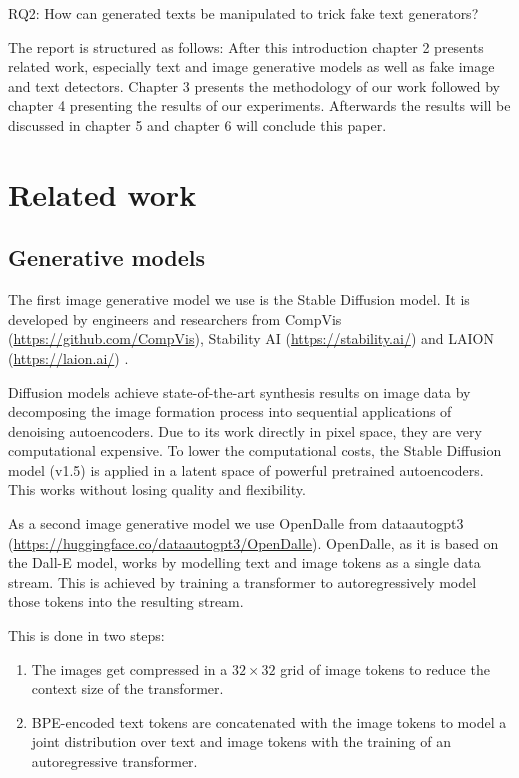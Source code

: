 \documentclass{article} %
\begin{document}
RQ2: How can generated texts be manipulated to trick fake text generators?


The report is structured as follows: After this introduction chapter 2 presents related work, especially text and image generative models as well as fake image and text detectors. Chapter 3 presents the methodology of our work followed by chapter 4 presenting the results of our experiments. Afterwards the results will be discussed in chapter 5 and chapter 6 will conclude this paper.

\section{Related work}

\subsection{Generative models}

The first image generative model we use is the Stable Diffusion model. It is developed by engineers and researchers from CompVis (\url{https://github.com/CompVis}), Stability AI (\url{https://stability.ai/}) and LAION (\url{https://laion.ai/}) \cite{patil2022stable}. 

Diffusion models achieve state-of-the-art synthesis results on image data by decomposing the image formation process into sequential applications of denoising autoencoders. Due to its work directly in pixel space, they are very computational expensive. To lower the computational costs, the Stable Diffusion model (v1.5) is applied in a latent space of powerful pretrained autoencoders. This works without losing quality and flexibility. \cite{Rombach_2022_CVPR}

As a second image generative model we use OpenDalle from dataautogpt3 (\url{https://huggingface.co/dataautogpt3/OpenDalle}). OpenDalle, as it is based on the Dall-E model, works by modelling text and image tokens as a single data stream. This is achieved by training a transformer to autoregressively model those tokens into the resulting stream.

This is done in two steps: 
\begin{enumerate}
	\item The images get compressed in a $32 \times 32$ grid of image tokens to reduce the context size of the transformer.
	\item BPE-encoded text tokens are concatenated with the image tokens to model a joint distribution over text and image tokens with the training of an autoregressive transformer.
\end{enumerate}
\end{document}
